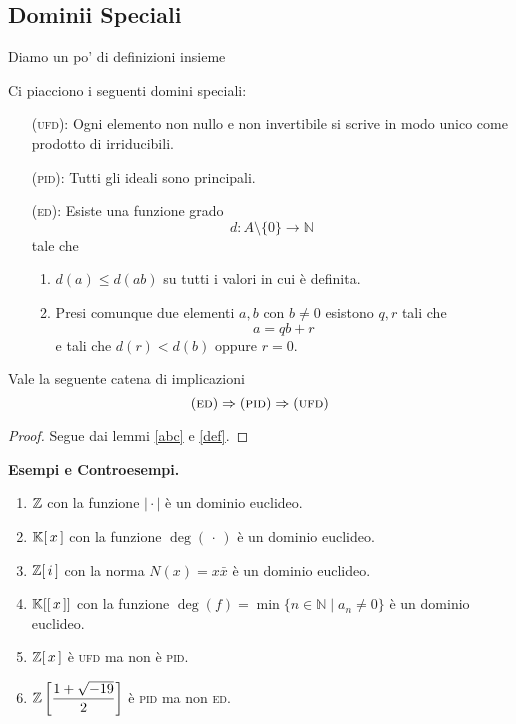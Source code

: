 \subsection{Dominii Speciali}
\begin{multicols}{2}
	Diamo un po' di definizioni insieme
	\begin{definition}
		Ci piacciono i seguenti domini speciali:
		\begin{itemize}
			\item [(\textsc{ufd}):] Ogni elemento non nullo e non invertibile si scrive in modo unico come prodotto di irriducibili.
			
			\item [(\textsc{pid}):] Tutti gli ideali sono principali.
			
			\item [(\textsc{ed}):] Esiste una funzione grado \[{d}:{A\setminus\{0\}}\to{\mathbb{N}}\]
			tale che 
			\begin{enumerate}
				\item $ d(a) \leq d(ab) $ su tutti i valori in cui è definita.
				\item Presi comunque due elementi $ a, b $ con $ b \neq 0 $ esistono $ q, r $ tali che
				\[ a = qb + r \]
				e tali che $ d(r) < d(b) $ oppure $ r = 0 $.
			\end{enumerate}
			
		\end{itemize}
	\end{definition}

\begin{theorem}
	Vale la seguente catena di implicazioni
	\[ (\textsc{ed})\Rightarrow(\textsc{pid})\Rightarrow(\textsc{ufd}) \]
\end{theorem}
\begin{proof}
	Segue dai lemmi \ref{abc} e \ref{def}. 
\end{proof}

\textbf{Esempi e Controesempi.}
\begin{enumerate}
	\item $ \mathbb{Z} $ con la funzione $ \mid \cdot\mid $ è un dominio euclideo.
	\item $ \mathbb{K}[\,x\,] $ con la funzione $ \deg(\,\cdot\,) $ è un dominio euclideo.
	\item $ \mathbb{Z}[\,i\,] $ con la norma $ N(x) = x\bar{x} $ è un dominio euclideo.
	\item $ \mathbb{K}[[\,x\,]] $ con la funzione $ \deg(f) = \min \{n \in \mathbb{N} \mid a_n \neq 0 \} $ è un dominio euclideo.
	\item $ \mathbb{Z}[\,x\,] $ è \textsc{ufd} ma non è \textsc{pid}.
	\item $ \mathbb{Z}\left[ \dfrac{1 + \sqrt{-19}}{2} \right] $ è \textsc{pid} ma non \textsc{ed}.
\end{enumerate}
	

\end{multicols}
